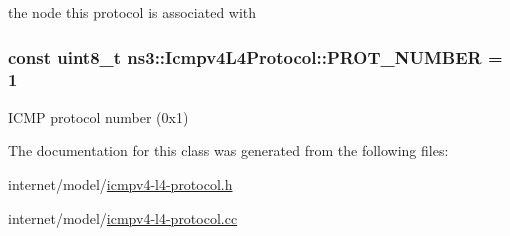 the node this protocol is associated with 

\subsubsection[{\texorpdfstring{P\+R\+O\+T\+\_\+\+N\+U\+M\+B\+ER}{PROT_NUMBER}}]{\setlength{\rightskip}{0pt plus 5cm}const uint8\+\_\+t ns3\+::\+Icmpv4\+L4\+Protocol\+::\+P\+R\+O\+T\+\_\+\+N\+U\+M\+B\+ER = 1\hspace{0.3cm}{\ttfamily [static]}}\hypertarget{classns3_1_1Icmpv4L4Protocol_a3419e4f8f36662059a64fcb29c3384ad}{}\label{classns3_1_1Icmpv4L4Protocol_a3419e4f8f36662059a64fcb29c3384ad}


I\+C\+MP protocol number (0x1) 



The documentation for this class was generated from the following files\+:\begin{DoxyCompactItemize}
\item 
internet/model/\hyperlink{icmpv4-l4-protocol_8h}{icmpv4-\/l4-\/protocol.\+h}\item 
internet/model/\hyperlink{icmpv4-l4-protocol_8cc}{icmpv4-\/l4-\/protocol.\+cc}\end{DoxyCompactItemize}
